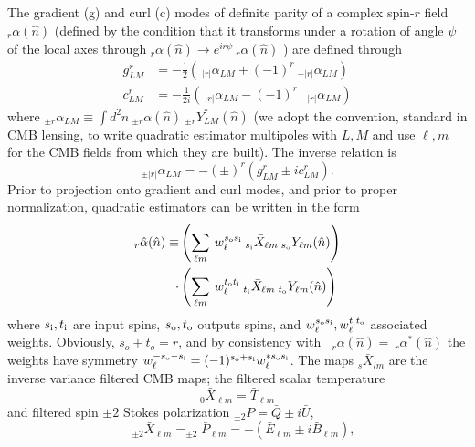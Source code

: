 \documentclass[reprint,prd, superscriptaddress, tightenlines, longbibliography, nofootinbib, eqsecnum, amsfonts, amsmath, floatfix, notitlepage, twocolumn]{revtex4-1}
\newcommand{\si}[0]{{s_{\rm i}}}
\newcommand{\ti}[0]{{t_{\rm i}}}
\newcommand{\so}[0]{{s_{\rm o}}}
\renewcommand{\to}[0]{{t_{\rm o}}}
\newcommand{\hn}[0]{\hat n}
\begin{document}
The gradient (g) and curl (c) modes of definite parity of a complex spin-$r$ field $_{r}\alpha(\hn)$ (defined by the condition that it transforms under a rotation of angle $\psi$ of the local axes through $_{r}\alpha(\hn) \rightarrow e^{i r \psi}\:_{r}\alpha(\hn)$ ) are defined through
\begin{eqnarray}
		g^{r}_{LM} &= -\frac 12\left(\:_{|r|} \alpha_{LM} + (-1)^r \:_{-|r|} \alpha_{LM}\right)\\
		c^{r}_{LM} &=-\frac 1{2i} \left( \:_{|r|} \alpha_{LM} - (-1)^r \:_{-|r|} \alpha_{LM} \right)
\end{eqnarray}
where  $_{\pm r} \alpha_{LM} \equiv \int d^2n \:_{\pm r}\alpha(\hn) \:_{\pm r}Y^*_{LM}(\hn)$ (we adopt the convention, standard in CMB lensing, to write quadratic estimator multipoles with $L, M$ and use $\ell, m$ for the CMB fields from which they are built).
The inverse relation is
\begin{equation}
	_{\pm |r|} \alpha_{LM} =- (\pm)^r\left( g^r_{LM} \pm i c^r_{LM} \right).
\end{equation}
Prior to projection onto gradient and curl modes, and prior to proper normalization, quadratic estimators can be written in the form \begin{equation}\label{QE}
\begin{split}	
 _{r}\hat \alpha(\hn) \equiv &\left(\sum_{\ell m}\: w^{\so\si}_\ell \:_{\si} \bar X_{\ell m} \:_\so Y_{\ell m}(\hn)\right)\\\cdot &\left(\sum_{\ell m}\:w^{\to\ti}_\ell  \:_{\ti} \bar X_{\ell m} \:_\to Y_{\ell m}(\hn)\right)
 \end{split} 
\end{equation}
where $\si, \ti$ are input spins, $\so, \to$ outputs spins, and $w_\ell^{\so\si}, w_\ell^{\ti\to}$ associated weights. Obviously, $s_o + t_o = r$, and by consistency with $_{-r} \alpha(\hn) = \:_r\alpha^*(\hn)$ the weights have symmetry $w_\ell^{-\so-\si} = (-1)^{\so + \si}w_\ell^{*\so \si}$.
\newline
\newline
The maps $_s \bar X_{lm}$ are the inverse variance filtered CMB maps; the filtered scalar temperature
\begin{equation}
	_0 \bar X_{\ell m} = \bar T_{\ell m}
\end{equation}	
and filtered spin $\pm 2$ Stokes polarization $_{\pm 2}P = \bar Q \pm i\bar U$,
\begin{equation}
\quad _{\pm 2} \bar X_{\ell m} = _{\pm 2}\bar P_{\ell m}= -\left(\bar E_{\ell m} \pm i\bar B_{\ell m} \right),
\end{equation}
\end{document}
